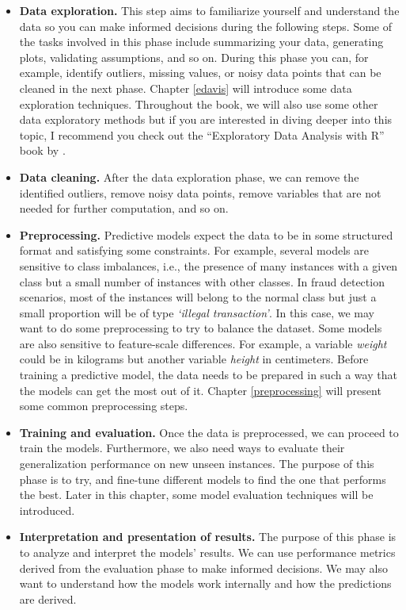 \documentclass[
  11pt,
]{krantz}
\begin{document}
\begin{itemize}
\item
  \textbf{Data exploration.} This step aims to familiarize yourself and understand the data so you can make informed decisions during the following steps. Some of the tasks involved in this phase include summarizing your data, generating plots, validating assumptions, and so on. During this phase you can, for example, identify outliers, missing values, or noisy data points that can be cleaned in the next phase. Chapter \ref{edavis} will introduce some data exploration techniques. Throughout the book, we will also use some other data exploratory methods but if you are interested in diving deeper into this topic, I recommend you check out the ``Exploratory Data Analysis with R'' book by \citet{peng2016}.
\item
  \textbf{Data cleaning.} After the data exploration phase, we can remove the identified outliers, remove noisy data points, remove variables that are not needed for further computation, and so on.
\item
  \textbf{Preprocessing.} Predictive models expect the data to be in some structured format and satisfying some constraints. For example, several models are sensitive to class imbalances, i.e., the presence of many instances with a given class but a small number of instances with other classes. In fraud detection scenarios, most of the instances will belong to the normal class but just a small proportion will be of type \emph{`illegal transaction'}. In this case, we may want to do some preprocessing to try to balance the dataset. Some models are also sensitive to feature-scale differences. For example, a variable \emph{weight} could be in kilograms but another variable \emph{height} in centimeters. Before training a predictive model, the data needs to be prepared in such a way that the models can get the most out of it. Chapter \ref{preprocessing} will present some common preprocessing steps.
\item
  \textbf{Training and evaluation.} Once the data is preprocessed, we can proceed to train the models. Furthermore, we also need ways to evaluate their generalization performance on new unseen instances. The purpose of this phase is to try, and fine-tune different models to find the one that performs the best. Later in this chapter, some model evaluation techniques will be introduced.
\item
  \textbf{Interpretation and presentation of results.} The purpose of this phase is to analyze and interpret the models' results. We can use performance metrics derived from the evaluation phase to make informed decisions. We may also want to understand how the models work internally and how the predictions are derived.
\end{itemize}
\end{document}
